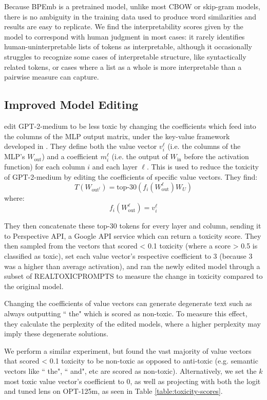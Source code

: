 \documentclass{article}
\theoremstyle{plain}
\theoremstyle{definition}
\begin{document}
Because BPEmb is a pretrained model, unlike most CBOW or skip-gram models, there is no ambiguity in the training data used to produce word similarities and results are easy to replicate. We find the interpretability scores given by the model to correspond with human judgment in most cases: it rarely identifies human-uninterpretable lists of tokens as interpretable, although it occasionally struggles to recognize some cases of interpretable structure, like syntactically related tokens, or cases where a list as a whole is more interpretable than a pairwise measure can capture.

\subsection{Improved Model Editing}

\citet{geva2022transformer} edit GPT-2-medium to be less toxic by changing the coefficients which feed into the columns of the MLP output matrix, under the key-value framework developed in \citet{geva2020transformer}. They define both the value vector $v_i^\ell$ (i.e. the columns of the MLP's $W_{\text{out}}$) and a coefficient $m_i^\ell$ (i.e. the output of $W_{\text{in}}$ before the activation function) for each column $i$ and each layer $\ell$. This is used to reduce the toxicity of GPT-2-medium by editing the coefficients of specific value vectors. They find:
$$T(W_{\text{out}^l}) = \text{top-}30(f_i(W_{\text{out}}^\ell)W_U) $$
where: 
$$f_i(W_{\text{out}}^\ell) = v_i^\ell$$

They then concatenate these top-30 tokens for every layer and column, sending it to Perspective API, a Google API service which can return a toxicity score. They then sampled from the vectors that scored < 0.1 toxicity (where a score > 0.5 is classified as toxic), set each value vector's respective coefficient to 3 (because 3 was a higher than average activation), and ran the newly edited model through a subset of REALTOXICPROMPTS \citep{gehman-etal-2020-realtoxicityprompts} to measure the change in toxicity compared to the original model. 

Changing the coefficients of value vectors can generate degenerate text such as always outputting `` the" which is scored as non-toxic. To measure this effect, they calculate the perplexity of the edited models, where a higher perplexity may imply these degenerate solutions. 

We perform a similar experiment, but found the vast majority of value vectors that scored < 0.1 toxicity to be non-toxic as opposed to anti-toxic (e.g. semantic vectors like `` the", `` and", etc are scored as non-toxic). Alternatively, we set the $k$ most toxic value vector's coefficient to 0, as well as projecting with both the logit and tuned lens on OPT-125m, as seen in Table \ref{table:toxicity-scores}. 
\end{document}
